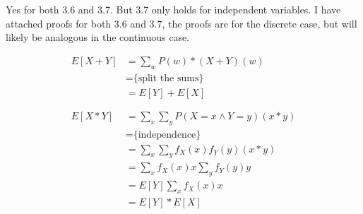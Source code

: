 \documentclass[a4paper,11pt]{article}
\begin{document}
Yes for both 3.6 and 3.7. But 3.7 only holds for independent variables.
I have attached proofs for both 3.6 and 3.7, the proofs are for
the discrete case, but will likely be analogous in the continuous case.

\begin{align*}
 E[X+Y] &= \sum_w P(w)*(X+Y)(w) \\
        &= \text{\{split the sums\}} \\
        &= E[Y] + E[X]\\
\\
\\
 E[X*Y] &= \sum_x \sum_y P(X = x \wedge Y = y)(x*y) \\
        &= \text{\{independence\}} \\
        &= \sum_x \sum_y f_X(x)f_Y(y)(x*y) \\
        &= \sum_x f_X(x)x \sum_y f_Y(y)y \\
        &= E[Y]\sum_x f_X(x)x \\
        &= E[Y] * E[X]
\end{align*}
\end{document}
